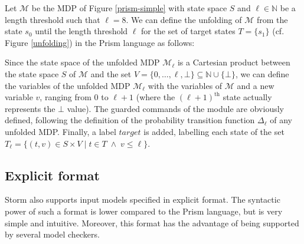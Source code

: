 \begin{example}
Let $\mathcal{M}$ be the MDP of Figure \ref{prism-simple} with state space $S$ and $\ell \in \mathbb{N}$
be a length threshold such that $\ell=8$. We can define the unfolding of $\mathcal{M}$ from the state $s_0$ until the length threshold $\ell$ for the set of target states $T = \{s_1\}$ (cf. Figure \ref{unfolding}) in the Prism language as follows:

\end{example}
Since the state space of the unfolded MDP $\mathcal{M}_\ell$ is a Cartesian product between the state space $S$ of $\mathcal{M}$ and the set $V = \{0, \dots, \ell, \bot\} \subseteq \mathbb{N} \cup \{\bot\}$, we can define the variables of the unfolded MDP $\mathcal{M}_\ell$ with the variables of $\mathcal{M}$ and a new variable $v$, ranging from $0$ to $\ell+1$ (where the $(\ell+1)^\text{th}$ state actually represents the $\bot$ value). The guarded
commands of the module are obviously defined, following the definition of the
probability transition function $\Delta_\ell$ of any unfolded MDP. Finally, a label $target$ is added,
labelling each state of the set $T_\ell = \{ (t, v) \in S \times V \; | \; t \in T \; \wedge \; v \leq \ell \}$.

\subsection{Explicit format}
Storm also supports input models specified in explicit format. The syntactic power of such a format is lower compared to the Prism language, but is
very simple and intuitive.
Moreover, this format has the advantage of being supported by several model checkers.\\

